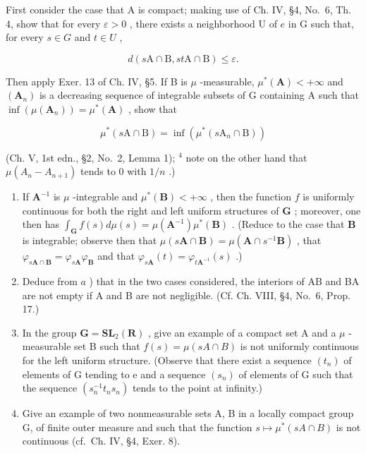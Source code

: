 First consider the case that A is compact; making use of Ch. IV, §4, No.~6, Th. 4, show that for every \(\varepsilon > 0\) , there exists a neighborhood U of \(e\) in G such that, for every \(s \in G\) and \(t \in U\) ,

\[
d (s \mathrm{A} \cap \mathrm{B}, s t \mathrm{A} \cap \mathrm{B}) \leqslant \varepsilon .
\]

Then apply Exer. 13 of Ch. IV, §5. If B is \(\mu\) -measurable, \(\mu^{*}(\mathbf{A}) < +\infty\) and \((\mathbf{A}_{n})\) is a decreasing sequence of integrable subsets of G containing A such that \(\inf (\mu (\mathbf{A}_n)) = \mu^{*}(\mathbf{A})\) , show that

\[
\mu^ {*} (s \mathrm{A} \cap \mathrm{B}) = \inf \left(\mu^ {*} (s \mathrm{A} _ {n} \cap \mathrm{B})\right)
\]

(Ch. V, 1st edn., §2, No.~2, Lemma 1); \(^{4}\) note on the other hand that \(\mu(A_{n}-A_{n+1})\) tends to 0 with \(1/n\) .)

\begin{enumerate}
\def\labelenumi{\alph{enumi})}
\setcounter{enumi}{1}
\item
  If \(\mathbf{A}^{-1}\) is \(\mu\) -integrable and \(\mu^{*}(\mathbf{B}) < +\infty\) , then the function \(f\) is uniformly continuous for both the right and left uniform structures of \(\mathbf{G}\) ; moreover, one then has \(\int_{\mathbf{G}} f(s) d\mu(s) = \mu(\mathbf{A}^{-1})\mu^{*}(\mathbf{B})\) . (Reduce to the case that \(\mathbf{B}\) is integrable; observe then that \(\mu(s\mathbf{A} \cap \mathbf{B}) = \mu(\mathbf{A} \cap s^{-1}\mathbf{B})\) , that \(\varphi_{s\mathbf{A} \cap \mathbf{B}} = \varphi_{s\mathbf{A}}\varphi_{\mathbf{B}}\) and that \(\varphi_{s\mathbf{A}}(t) = \varphi_{t\mathbf{A}^{-1}}(s)\) .)
\item
  Deduce from \(a\) ) that in the two cases considered, the interiors of AB and BA are not empty if A and B are not negligible. (Cf. Ch. VIII, §4, No.~6, Prop. 17.)
\item
  In the group \(\mathbf{G} = \mathbf{SL}_{2}(\mathbf{R})\) , give an example of a compact set A and a \(\mu\) -measurable set B such that \(f(s) = \mu(sA \cap B)\) is not uniformly continuous for the left uniform structure. (Observe that there exist a sequence \((t_{n})\) of elements of G tending to e and a sequence \((s_{n})\) of elements of G such that the sequence \((s_{n}^{-1}t_{n}s_{n})\) tends to the point at infinity.)
\item
  Give an example of two nonmeasurable sets A, B in a locally compact group G, of finite outer measure and such that the function \(s \mapsto \mu^{*}(sA \cap B)\) is not continuous (cf.~Ch. IV, §4, Exer. 8).
\end{enumerate}

